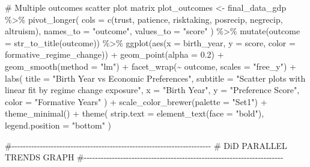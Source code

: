 \documentclass[
  letterpaper,
  DIV=11,
  numbers=noendperiod]{scrartcl}
\newenvironment{Shaded}{\begin{snugshade}}{\end{snugshade}}
\newcommand{\AttributeTok}[1]{\textcolor[rgb]{0.40,0.45,0.13}{#1}}
\newcommand{\CommentTok}[1]{\textcolor[rgb]{0.37,0.37,0.37}{#1}}
\newcommand{\FloatTok}[1]{\textcolor[rgb]{0.68,0.00,0.00}{#1}}
\newcommand{\FunctionTok}[1]{\textcolor[rgb]{0.28,0.35,0.67}{#1}}
\newcommand{\NormalTok}[1]{\textcolor[rgb]{0.00,0.23,0.31}{#1}}
\newcommand{\OtherTok}[1]{\textcolor[rgb]{0.00,0.23,0.31}{#1}}
\newcommand{\SpecialCharTok}[1]{\textcolor[rgb]{0.37,0.37,0.37}{#1}}
\newcommand{\StringTok}[1]{\textcolor[rgb]{0.13,0.47,0.30}{#1}}
\begin{document}
\begin{Shaded}
\begin{Highlighting}[]
\CommentTok{\# Multiple outcomes scatter plot matrix}
\NormalTok{plot\_outcomes }\OtherTok{\textless{}{-}}\NormalTok{ final\_data\_gdp }\SpecialCharTok{\%\textgreater{}\%}
  \FunctionTok{pivot\_longer}\NormalTok{(}
    \AttributeTok{cols =} \FunctionTok{c}\NormalTok{(trust, patience, risktaking, posrecip, negrecip, altruism),}
    \AttributeTok{names\_to =} \StringTok{"outcome"}\NormalTok{,}
    \AttributeTok{values\_to =} \StringTok{"score"}
\NormalTok{  ) }\SpecialCharTok{\%\textgreater{}\%}
  \FunctionTok{mutate}\NormalTok{(}\AttributeTok{outcome =} \FunctionTok{str\_to\_title}\NormalTok{(outcome)) }\SpecialCharTok{\%\textgreater{}\%}
  \FunctionTok{ggplot}\NormalTok{(}\FunctionTok{aes}\NormalTok{(}\AttributeTok{x =}\NormalTok{ birth\_year, }\AttributeTok{y =}\NormalTok{ score, }\AttributeTok{color =}\NormalTok{ formative\_regime\_change)) }\SpecialCharTok{+}
  \FunctionTok{geom\_point}\NormalTok{(}\AttributeTok{alpha =} \FloatTok{0.2}\NormalTok{) }\SpecialCharTok{+}
  \FunctionTok{geom\_smooth}\NormalTok{(}\AttributeTok{method =} \StringTok{"lm"}\NormalTok{) }\SpecialCharTok{+}
  \FunctionTok{facet\_wrap}\NormalTok{(}\SpecialCharTok{\textasciitilde{}}\NormalTok{ outcome, }\AttributeTok{scales =} \StringTok{"free\_y"}\NormalTok{) }\SpecialCharTok{+}
  \FunctionTok{labs}\NormalTok{(}
    \AttributeTok{title =} \StringTok{"Birth Year vs Economic Preferences"}\NormalTok{,}
    \AttributeTok{subtitle =} \StringTok{"Scatter plots with linear fit by regime change exposure"}\NormalTok{,}
    \AttributeTok{x =} \StringTok{"Birth Year"}\NormalTok{,}
    \AttributeTok{y =} \StringTok{"Preference Score"}\NormalTok{,}
    \AttributeTok{color =} \StringTok{"Formative Years"}
\NormalTok{  ) }\SpecialCharTok{+}
  \FunctionTok{scale\_color\_brewer}\NormalTok{(}\AttributeTok{palette =} \StringTok{"Set1"}\NormalTok{) }\SpecialCharTok{+}
  \FunctionTok{theme\_minimal}\NormalTok{() }\SpecialCharTok{+}
  \FunctionTok{theme}\NormalTok{(}
    \AttributeTok{strip.text =} \FunctionTok{element\_text}\NormalTok{(}\AttributeTok{face =} \StringTok{"bold"}\NormalTok{),}
    \AttributeTok{legend.position =} \StringTok{"bottom"}
\NormalTok{  )}


\CommentTok{\#{-}{-}{-}{-}{-}{-}{-}{-}{-}{-}{-}{-}{-}{-}{-}{-}{-}{-}{-}{-}{-}{-}{-}{-}{-}{-}{-}{-}{-}{-}{-}{-}{-}{-}{-}{-}{-}{-}{-}{-}{-}{-}{-}{-}{-}{-}{-}{-}{-}{-}{-}{-}{-}{-}{-}{-}{-}{-}{-}{-}{-}{-}{-}{-}{-}{-}{-}{-}{-}{-}{-}}
\CommentTok{\# DiD PARALLEL TRENDS GRAPH}
\CommentTok{\#{-}{-}{-}{-}{-}{-}{-}{-}{-}{-}{-}{-}{-}{-}{-}{-}{-}{-}{-}{-}{-}{-}{-}{-}{-}{-}{-}{-}{-}{-}{-}{-}{-}{-}{-}{-}{-}{-}{-}{-}{-}{-}{-}{-}{-}{-}{-}{-}{-}{-}{-}{-}{-}{-}{-}{-}{-}{-}{-}{-}{-}{-}{-}{-}{-}{-}{-}{-}{-}{-}{-}}


\end{Highlighting}
\end{Shaded}
\end{document}
